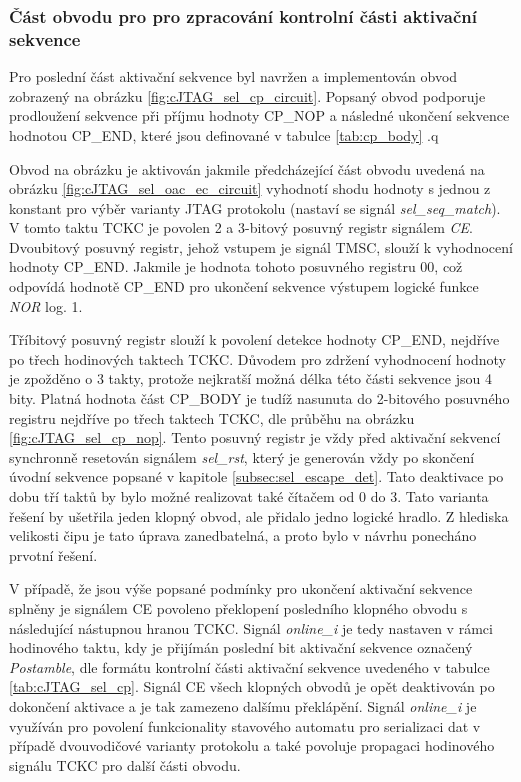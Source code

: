 \subsubsection{Část obvodu pro pro zpracování kontrolní části aktivační sekvence}
Pro poslední část aktivační sekvence byl navržen a implementován obvod zobrazený na obrázku \ref{fig:cJTAG_sel_cp_circuit}. Popsaný obvod podporuje prodloužení sekvence při příjmu hodnoty CP\_NOP a následné ukončení sekvence hodnotou CP\_END, které jsou definované v tabulce \ref{tab:cp_body} .q %

Obvod na obrázku je aktivován jakmile předcházející část obvodu uvedená na obrázku \ref{fig:cJTAG_sel_oac_ec_circuit} vyhodnotí shodu hodnoty s jednou z konstant pro výběr varianty \acs{JTAG} protokolu (nastaví se signál \textit{sel\_seq\_match}). V tomto taktu TCKC je povolen 2 a 3-bitový posuvný registr signálem \textit{CE}. Dvoubitový posuvný registr, jehož vstupem je signál TMSC, slouží k vyhodnocení hodnoty CP\_END. Jakmile je hodnota tohoto posuvného registru 00, což odpovídá hodnotě CP\_END pro ukončení sekvence výstupem logické funkce \textit{NOR} log. 1.

Tříbitový posuvný registr slouží k povolení detekce hodnoty CP\_END, nejdříve po třech hodinových taktech TCKC. Důvodem pro zdržení vyhodnocení hodnoty je zpožděno o 3 takty, protože nejkratší možná délka této části sekvence jsou 4 bity. Platná hodnota část CP\_BODY je tudíž nasunuta do 2-bitového posuvného registru nejdříve po třech taktech TCKC, dle průběhu na obrázku \ref{fig:cJTAG_sel_cp_nop}. Tento posuvný registr je vždy před aktivační sekvencí synchronně resetován signálem \textit{sel\_rst}, který je generován vždy po skončení úvodní sekvence popsané v kapitole \ref{subsec:sel_escape_det}. Tato deaktivace po dobu tří taktů by bylo možné realizovat také čítačem od 0 do 3. Tato varianta řešení by ušetřila jeden klopný obvod, ale přidalo jedno logické hradlo. Z hlediska velikosti čipu je tato úprava zanedbatelná, a proto bylo v návrhu ponecháno prvotní řešení.

V případě, že jsou výše popsané podmínky pro ukončení aktivační sekvence splněny je signálem CE povoleno překlopení posledního klopného obvodu s následující nástupnou hranou TCKC. Signál \textit{online\_i} je tedy nastaven v rámci hodinového taktu, kdy je přijímán poslední bit aktivační sekvence označený \textit{Postamble}, dle formátu kontrolní části aktivační sekvence uvedeného v tabulce \ref{tab:cJTAG_sel_cp}. Signál CE všech klopných obvodů je opět deaktivován po dokončení aktivace a je tak zamezeno dalšímu překlápění. Signál \textit{online\_i} je využíván pro povolení funkcionality stavového automatu pro serializaci dat v případě dvouvodičové varianty protokolu a také povoluje propagaci hodinového signálu TCKC pro další části obvodu. 

